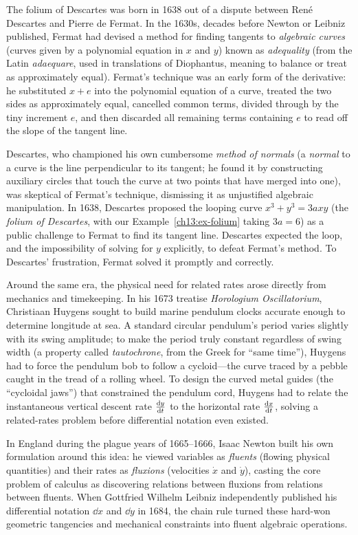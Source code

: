 \begin{historybox}
The folium of Descartes was born in 1638 out of a dispute between Ren\'e Descartes and Pierre de Fermat. In the 1630s, decades before Newton or Leibniz published, Fermat had devised a method for finding tangents to \emph{algebraic curves} (curves given by a polynomial equation in $x$ and $y$) known as \emph{adequality} (from the Latin \emph{adaequare}, used in translations of Diophantus, meaning to balance or treat as approximately equal). Fermat's technique was an early form of the derivative: he substituted $x + e$ into the polynomial equation of a curve, treated the two sides as approximately equal, cancelled common terms, divided through by the tiny increment $e$, and then discarded all remaining terms containing $e$ to read off the slope of the tangent line.

Descartes, who championed his own cumbersome \emph{method of normals} (a \emph{normal} to a curve is the line perpendicular to its tangent; he found it by constructing auxiliary circles that touch the curve at two points that have merged into one), was skeptical of Fermat's technique, dismissing it as unjustified algebraic manipulation. In 1638, Descartes proposed the looping curve $x^3 + y^3 = 3axy$ (the \emph{folium of Descartes}, with our Example~\ref{ch13:ex-folium} taking $3a = 6$) as a public challenge to Fermat to find its tangent line. Descartes expected the loop, and the impossibility of solving for $y$ explicitly, to defeat Fermat's method. To Descartes' frustration, Fermat solved it promptly and correctly.

Around the same era, the physical need for related rates arose directly from mechanics and timekeeping. In his 1673 treatise \emph{Horologium Oscillatorium}, Christiaan Huygens sought to build marine pendulum clocks accurate enough to determine longitude at sea. A standard circular pendulum's period varies slightly with its swing amplitude; to make the period truly constant regardless of swing width (a property called \emph{tautochrone}, from the Greek for ``same time''), Huygens had to force the pendulum bob to follow a cycloid---the curve traced by a pebble caught in the tread of a rolling wheel. To design the curved metal guides (the ``cycloidal jaws'') that constrained the pendulum cord, Huygens had to relate the instantaneous vertical descent rate $\frac{\mathrm{d} y}{\mathrm{d} t}$ to the horizontal rate $\frac{\mathrm{d} x}{\mathrm{d} t}$, solving a related-rates problem before differential notation even existed.

In England during the plague years of 1665--1666, Isaac Newton built his own formulation around this idea: he viewed variables as \emph{fluents} (flowing physical quantities) and their rates as \emph{fluxions} (velocities $\dot{x}$ and $\dot{y}$), casting the core problem of calculus as discovering relations between fluxions from relations between fluents. When Gottfried Wilhelm Leibniz independently published his differential notation $\dd x$ and $\dd y$ in 1684, the chain rule turned these hard-won geometric tangencies and mechanical constraints into fluent algebraic operations.


\end{historybox}
